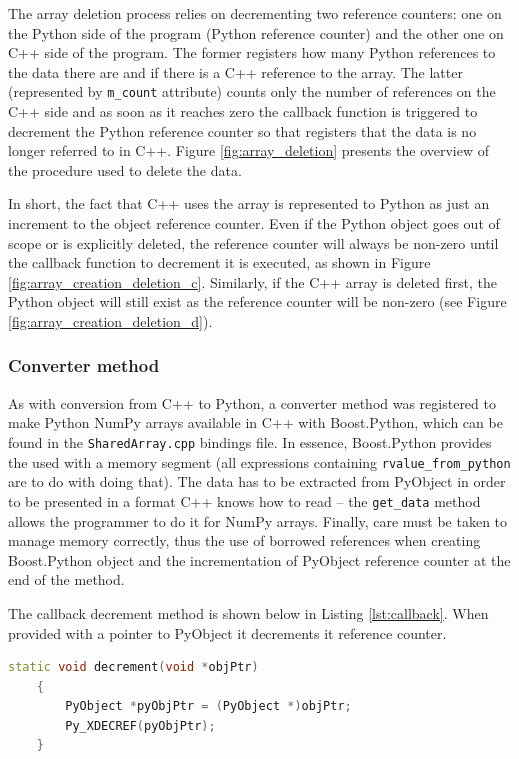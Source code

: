 The array deletion process relies on decrementing two reference counters: one 
on the Python side of the program (Python reference counter) and the other one 
on C++ side of the program. The former registers how many Python references to 
the data there are and if there is a C++ reference to the array. The latter 
(represented by \texttt{m\_count} attribute) counts only the number of references 
on the C++ side and as soon as it reaches zero the callback function is triggered to 
decrement the Python reference counter so that registers that the data is no longer 
referred to in C++. Figure \ref{fig:array_deletion} presents the overview of the 
procedure used to delete the data.

In short, the fact that C++ uses the array is represented to Python as just an 
increment to the object reference counter. Even if the Python object goes out 
of scope or is explicitly deleted, the reference counter will always be non-zero 
until the callback function to decrement it is executed, as shown in Figure 
\ref{fig:array_creation_deletion_c}. Similarly, if the C++ array is deleted first, 
the Python object will still exist as the reference counter will be non-zero 
(see Figure \ref{fig:array_creation_deletion_d}).

\subsubsection{Converter method}

As with conversion from C++ to Python, a converter method was registered to make
Python NumPy arrays available in C++ with Boost.Python, which can be found in
the \texttt{SharedArray.cpp} bindings file.  In essence, Boost.Python provides
the used with a memory segment (all expressions containing
\texttt{rvalue\_from\_python} are to do with doing that). The data has to be
extracted from PyObject in order to be presented in a format C++ knows how to
read -- the \texttt{get\_data} method allows the programmer to do it for NumPy
arrays. Finally, care must be taken to manage memory correctly, thus the use of
borrowed references when creating Boost.Python object and the incrementation of
PyObject reference counter at the end of the method.

The callback decrement method is shown below in Listing \ref{lst:callback}. 
When provided with a pointer to PyObject it decrements it reference counter.

\begin{lstlisting}[caption={The decrement method called when the \texttt{m\_count} of C++ array reaches 0.}, label={lst:callback}, language=C++]
static void decrement(void *objPtr) 
    {
        PyObject *pyObjPtr = (PyObject *)objPtr;
        Py_XDECREF(pyObjPtr);
    }
\end{lstlisting}

